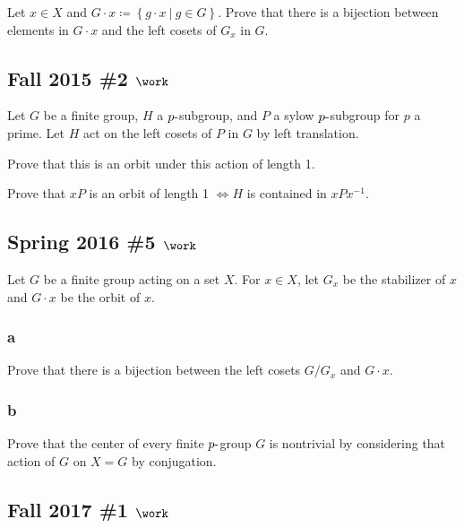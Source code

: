 Let \(x\in X\) and
\(G\cdot x \coloneqq\left\{{g\cdot x {~\mathrel{\Big|}~}g\in G}\right\}\).
Prove that there is a bijection between elements in \(G\cdot x\) and the
left cosets of \(G_x\) in \(G\).

\hypertarget{fall-2015-2-work}{%
\subsection{\texorpdfstring{Fall 2015 \#2
\(\work\)}{Fall 2015 \#2 \textbackslash work}}\label{fall-2015-2-work}}

Let \(G\) be a finite group, \(H\) a \(p{\hbox{-}}\)subgroup, and \(P\)
a sylow \(p{\hbox{-}}\)subgroup for \(p\) a prime. Let \(H\) act on the
left cosets of \(P\) in \(G\) by left translation.

Prove that this is an orbit under this action of length 1.

Prove that \(xP\) is an orbit of length 1 \(\iff H\) is contained in
\(xPx^{-1}\).

\hypertarget{spring-2016-5-work}{%
\subsection{\texorpdfstring{Spring 2016 \#5
\(\work\)}{Spring 2016 \#5 \textbackslash work}}\label{spring-2016-5-work}}

Let \(G\) be a finite group acting on a set \(X\). For \(x\in X\), let
\(G_x\) be the stabilizer of \(x\) and \(G\cdot x\) be the orbit of
\(x\).

\hypertarget{a-15}{%
\subsubsection{a}\label{a-15}}

Prove that there is a bijection between the left cosets \(G/G_x\) and
\(G\cdot x\).

\hypertarget{b-15}{%
\subsubsection{b}\label{b-15}}

Prove that the center of every finite \(p{\hbox{-}}\)group \(G\) is
nontrivial by considering that action of \(G\) on \(X=G\) by
conjugation.

\hypertarget{fall-2017-1-work}{%
\subsection{\texorpdfstring{Fall 2017 \#1
\(\work\)}{Fall 2017 \#1 \textbackslash work}}\label{fall-2017-1-work}}

